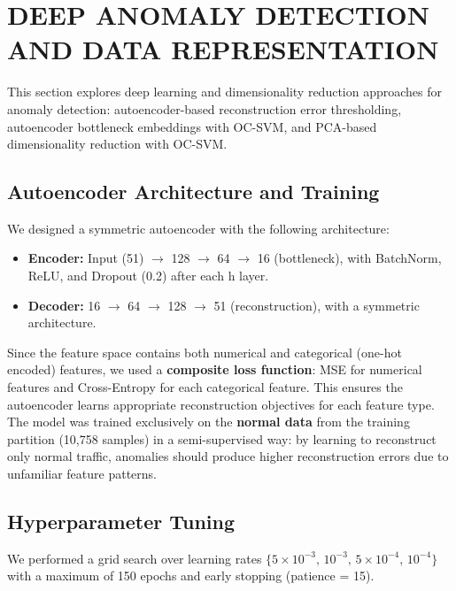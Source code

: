 
\section{DEEP ANOMALY DETECTION AND DATA REPRESENTATION} \label{sec:task3}

This section explores deep learning and dimensionality reduction approaches for anomaly detection: autoencoder-based reconstruction error thresholding, autoencoder bottleneck embeddings with OC-SVM, and PCA-based dimensionality reduction with OC-SVM.

\subsection{Autoencoder Architecture and Training} \label{sec:autoencoder}

    We designed a symmetric autoencoder with the following architecture:
    \begin{itemize}
        \item \textbf{Encoder:} Input (51) $\rightarrow$ 128 $\rightarrow$ 64 $\rightarrow$ 16 (bottleneck), with BatchNorm, ReLU, and Dropout (0.2) after each h layer.
        \item \textbf{Decoder:} 16 $\rightarrow$ 64 $\rightarrow$ 128 $\rightarrow$ 51 (reconstruction), with a symmetric architecture.
    \end{itemize}

    \noindent
    Since the feature space contains both numerical and categorical (one-hot encoded) features, we used a \textbf{composite loss function}: MSE for numerical features and Cross-Entropy for each categorical feature.
    This ensures the autoencoder learns appropriate reconstruction objectives for each feature type.
    The model was trained exclusively on the \textbf{normal data} from the training partition (10,758 samples) in a semi-supervised way: by learning to reconstruct only normal traffic, anomalies should produce higher reconstruction errors due to unfamiliar feature patterns.

\subsection{Hyperparameter Tuning} \label{sec:hp_tuning}

    We performed a grid search over learning rates $\{5 \times 10^{-3},\, 10^{-3},\, 5 \times 10^{-4},\, 10^{-4}\}$ with a maximum of 150 epochs and early stopping (patience = 15).

